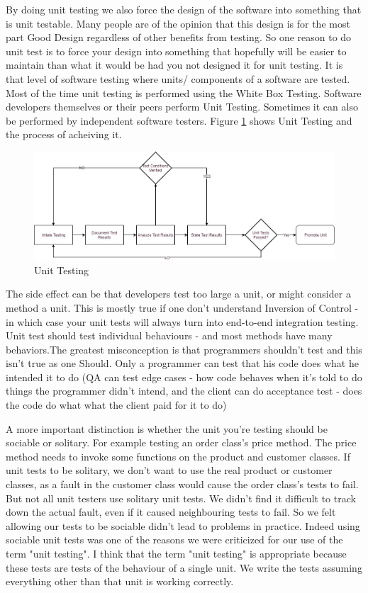 \documentclass[article,type=msc,colorback,accentcolor=tud9c,twoside,11pt]{tudthesis}
\begin{document}
	By doing unit testing we also force the design of the software into something that is unit testable. Many people are of the opinion that this design is for the most part Good Design regardless of other benefits from testing. So one reason to do unit test is to force your design into something that hopefully will be easier to maintain than what it would be had you not designed it for unit testing. It is that level of software testing where units/ components of a software are tested. Most of the time unit testing is performed using the White Box Testing. Software developers themselves or their peers perform Unit Testing. Sometimes it can also be performed by independent software testers. Figure \ref{fig:UnitTesting} shows Unit Testing and the process of acheiving it.
	\begin{figure}[h]
		\centering
		\includegraphics[scale=0.5]{UnitTesting.jpg}
		\caption{Unit Testing}
		\label{fig:UnitTesting}
	\end{figure}
	
	The side effect can be that developers test too large a unit, or might consider a method a unit. This is mostly true if one don't understand Inversion of Control - in which case your unit tests will always turn into end-to-end integration testing. Unit test should test individual behaviours - and most methods have many behaviors.The greatest misconception is that programmers shouldn't test and this isn't true as one Should. Only a programmer can test that his code does what he intended it to do (QA can test edge cases - how code behaves when it's told to do things the programmer didn't intend, and the client can do acceptance test - does the code do what what the client paid for it to do)	
	
	A more important distinction is whether the unit you're testing should be sociable or solitary. For example testing an order class's price method. The price method needs to invoke some functions on the product and customer classes. If unit tests to be solitary, we don't want to use the real product or customer classes, as a fault in the customer class would cause the order class's tests to fail. But not all unit testers use solitary unit tests. We didn't find it difficult to track down the actual fault, even if it caused neighbouring tests to fail. So we felt allowing our tests to be sociable didn't lead to problems in practice. Indeed using sociable unit tests was one of the reasons we were criticized for our use of the term "unit testing". I think that the term "unit testing" is appropriate because these tests are tests of the behaviour of a single unit. We write the tests assuming everything other than that unit is working correctly.
	\clearpage
\end{document}
